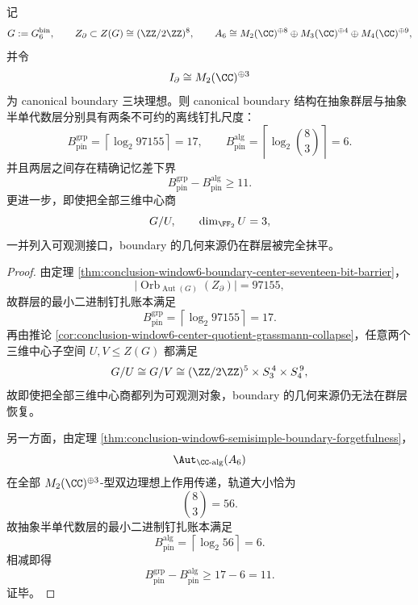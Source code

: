 \begin{theorem}\label{thm:conclusion-window6-boundary-pinning-two-scales-memory-gap}
记
\[
G:=G_6^{\mathrm{bin}},
\qquad
Z_{\partial}\subset Z(G)\cong (\ZZ/2\ZZ)^8,
\qquad
A_6\cong M_2(\CC)^{\oplus 8}\oplus M_3(\CC)^{\oplus 4}\oplus M_4(\CC)^{\oplus 9},
\]
并令
\[
I_{\partial}\cong M_2(\CC)^{\oplus 3}
\]
为 canonical boundary 三块理想。则 canonical boundary 结构在抽象群层与抽象半单代数层分别具有两条不可约的离线钉扎尺度：
\[
B_{\mathrm{pin}}^{\mathrm{grp}}
=
\left\lceil \log_2 97155\right\rceil
=
17,
\qquad
B_{\mathrm{pin}}^{\mathrm{alg}}
=
\left\lceil \log_2 \binom{8}{3}\right\rceil
=
6.
\]
并且两层之间存在精确记忆差下界
\[
B_{\mathrm{pin}}^{\mathrm{grp}}-B_{\mathrm{pin}}^{\mathrm{alg}}\ge 11.
\]
更进一步，即使把全部三维中心商
\[
G/U,\qquad \dim_{\FF_2}U=3,
\]
一并列入可观测接口，boundary 的几何来源仍在群层被完全抹平。
\end{theorem}
\begin{proof}
由定理 \ref{thm:conclusion-window6-boundary-center-seventeen-bit-barrier}，
\[
\bigl|\operatorname{Orb}_{\operatorname{Aut}(G)}(Z_{\partial})\bigr|=97155,
\]
故群层的最小二进制钉扎账本满足
\[
B_{\mathrm{pin}}^{\mathrm{grp}}=\left\lceil \log_2 97155\right\rceil=17.
\]
再由推论 \ref{cor:conclusion-window6-center-quotient-grassmann-collapse}，任意两个三维中心子空间 \(U,V\le Z(G)\) 都满足
\[
G/U\cong G/V\cong (\ZZ/2\ZZ)^5\times S_3^{\,4}\times S_4^{\,9},
\]
故即使把全部三维中心商都列为可观测对象，boundary 的几何来源仍无法在群层恢复。

另一方面，由定理 \ref{thm:conclusion-window6-semisimple-boundary-forgetfulness}，
\[
\Aut_{\CC\text{-alg}}(A_6)
\]
在全部 \(M_2(\CC)^{\oplus 3}\)-型双边理想上作用传递，轨道大小恰为
\[
\binom{8}{3}=56.
\]
故抽象半单代数层的最小二进制钉扎账本满足
\[
B_{\mathrm{pin}}^{\mathrm{alg}}=\left\lceil \log_2 56\right\rceil=6.
\]
相减即得
\[
B_{\mathrm{pin}}^{\mathrm{grp}}-B_{\mathrm{pin}}^{\mathrm{alg}}\ge 17-6=11.
\]
证毕。
\end{proof}

